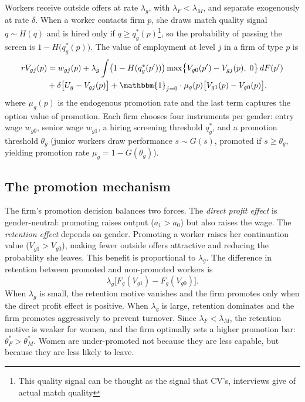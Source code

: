 \documentclass[11pt]{article}
\begin{document}
Workers receive outside offers at rate $\lambda_g$, with $\lambda_F < \lambda_M$, and separate exogenously at rate $\delta$. When a worker contacts firm $p$, she draws match quality signal  $q \sim H(q)$ and is hired only if $q \geq q_g^*(p)$\footnote{This quality signal can be thought as the signal that CV's, interviews give of actual match quality}, so the probability of passing the screen is $1 - H\bigl(q_g^*(p)\bigr)$. The value of employment at level $j$ in a firm of type $p$ is
\begin{align*}
    rV_{gj}(p) & = w_{gj}(p) + \lambda_g \int \bigl(1 - H(q_g^*(p'))\bigr) \max\bigl\{V_{g0}(p') - V_{gj}(p),\; 0\bigr\} \, dF(p') \\
    & + \delta\bigl[U_g - V_{gj}(p)\bigr] + \mathbbm{1}_{j=0} \cdot \mu_g(p)\bigl[V_{g1}(p) - V_{g0}(p)\bigr],
\end{align*}
where $\mu_g(p)$ is the endogenous promotion rate and the last term captures the option value of promotion. Each firm chooses four instruments per gender: entry wage $w_{g0}$, senior wage $w_{g1}$, a hiring screening threshold $q_g^*$, and a promotion threshold $\theta_g$ (junior workers draw performance $s \sim G(s)$, promoted if $s \geq \theta_g$, yielding promotion rate $\mu_g = 1 - G(\theta_g)$).

\subsection{The promotion mechanism}

The firm's promotion decision balances two forces. The \textit{direct profit effect} is gender-neutral: promoting raises output ($a_1 > a_0$) but also raises the wage. The \textit{retention effect} depends on gender. Promoting a worker raises her continuation value ($V_{g1} > V_{g0}$), making fewer outside offers attractive and reducing the probability she leaves. This benefit is proportional to $\lambda_g$. The difference in retention between promoted and non-promoted workers is
\begin{equation*}
    \lambda_g \bigl[F_g(V_{g1}) - F_g(V_{g0})\bigr].
\end{equation*}
When $\lambda_g$ is small, the retention motive vanishes and the firm promotes only when the direct profit effect is positive. When $\lambda_g$ is large, retention dominates and the firm promotes aggressively to prevent turnover. Since $\lambda_F < \lambda_M$, the retention motive is weaker for women, and the firm optimally sets a higher promotion bar: $\theta_F^* > \theta_M^*$. Women are under-promoted not because they are less capable, but because they are less likely to leave.
\end{document}
